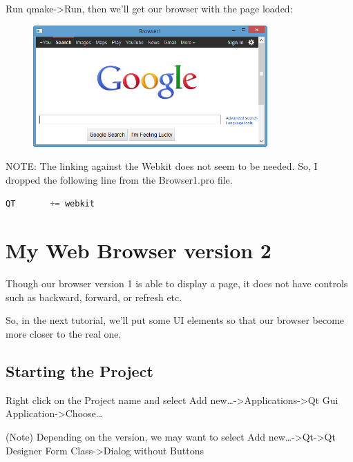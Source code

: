 Run qmake-\textgreater{}Run, then we'll get our browser with the page
loaded:

\begin{figure}[htbp]
\centering
\includegraphics[width=0.8\textwidth]{images/Browser1_Run.png}
\caption{}
\end{figure}

NOTE: The linking against the Webkit does not seem to be needed. So, I
dropped the following line from the Browser1.pro file.

\begin{lstlisting}[language=c++, numbers=none]
QT       += webkit
\end{lstlisting}

\section{My Web Browser version 2}\label{my-web-browser-version-2}

Though our browser version 1 is able to display a page, it does not have
controls such as backward, forward, or refresh etc.

So, in the next tutorial, we'll put some UI elements so that our browser
become more closer to the real one.

\subsection{Starting the Project}\label{starting-the-project}

Right click on the Project name and select Add
new\ldots{}-\textgreater{}Applications-\textgreater{}Qt Gui
Application-\textgreater{}Choose\ldots{}

(Note) Depending on the version, we may want to select Add
new\ldots{}-\textgreater{}Qt-\textgreater{}Qt Designer Form
Class-\textgreater{}Dialog without Buttons

